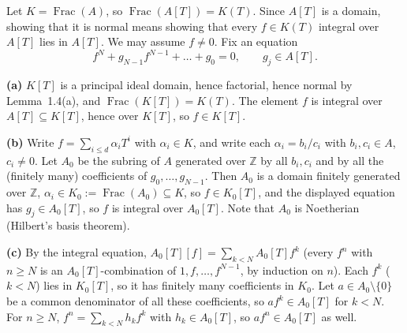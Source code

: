 \documentclass[11pt]{article}
\begin{document}
\pf
Let $K=\operatorname{Frac}(A)$, so $\operatorname{Frac}(A[T])=K(T)$. Since $A[T]$ is a domain, showing that it is normal means showing that every $f\in K(T)$ integral over $A[T]$ lies in $A[T]$. We may assume $f\neq0$. Fix an equation
\[ f^N+g_{N-1}f^{N-1}+\dots+g_0=0,\qquad g_j\in A[T]. \]

\textbf{(a)} $K[T]$ is a principal ideal domain, hence factorial, hence normal by Lemma~1.4(a), and $\operatorname{Frac}(K[T])=K(T)$. The element $f$ is integral over $A[T]\subseteq K[T]$, hence over $K[T]$, so $f\in K[T]$.

\textbf{(b)} Write $f=\sum_{i\le d}\alpha_iT^i$ with $\alpha_i\in K$, and write each $\alpha_i=b_i/c_i$ with $b_i,c_i\in A$, $c_i\neq0$. Let $A_0$ be the subring of $A$ generated over $\mathbb Z$ by all $b_i,c_i$ and by all the (finitely many) coefficients of $g_0,\dots,g_{N-1}$. Then $A_0$ is a domain finitely generated over $\mathbb Z$, $\alpha_i\in K_0:=\operatorname{Frac}(A_0)\subseteq K$, so $f\in K_0[T]$, and the displayed equation has $g_j\in A_0[T]$, so $f$ is integral over $A_0[T]$. Note that $A_0$ is Noetherian (Hilbert's basis theorem).

\textbf{(c)} By the integral equation, $A_0[T][f]=\sum_{k<N}A_0[T]f^k$ (every $f^n$ with $n\ge N$ is an $A_0[T]$-combination of $1,f,\dots,f^{N-1}$, by induction on $n$). Each $f^k$ ($k<N$) lies in $K_0[T]$, so it has finitely many coefficients in $K_0$. Let $a\in A_0\setminus\{0\}$ be a common denominator of all these coefficients, so $af^k\in A_0[T]$ for $k<N$. For $n\ge N$, $f^n=\sum_{k<N}h_kf^k$ with $h_k\in A_0[T]$, so $af^n\in A_0[T]$ as well.
\end{document}
